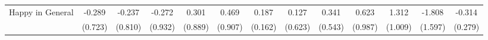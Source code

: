 {\begin{tabular}{l*{12}{c}}
\addlinespace
Happy in General&      -0.289         &      -0.237         &      -0.272         &       0.301         &       0.469         &       0.187         &       0.127         &       0.341         &       0.623         &       1.312         &      -1.808         &      -0.314         \\
            &     (0.723)         &     (0.810)         &     (0.932)         &     (0.889)         &     (0.907)         &     (0.162)         &     (0.623)         &     (0.543)         &     (0.987)         &     (1.009)         &     (1.597)         &     (0.279)         \\
\bottomrule
\end{tabular}
}
